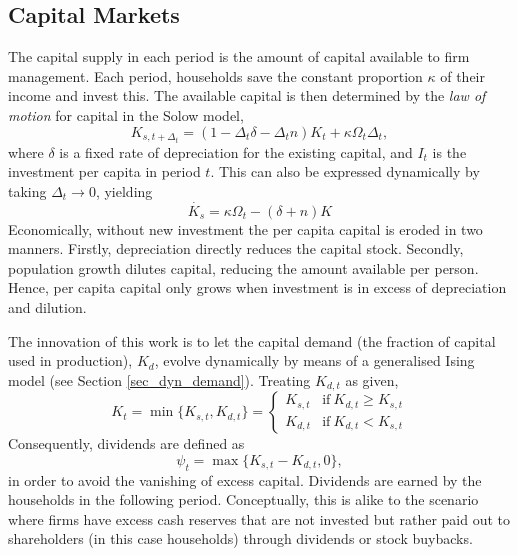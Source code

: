 \documentclass[11pt]{article}
\begin{document}
\subsection{Capital Markets}\label{sec_cap_mkt}
The capital supply in each period is the amount of capital available to firm management. Each period, households save the constant proportion $\kappa$ of their income and invest this.
The available capital is then determined by the \textit{law of motion} for capital in the Solow model, 
\begin{equation}\label{eq_cap_motion}
K_{s,t+\Delta_t} = (1-\Delta_t\delta-\Delta_tn)K_t + \kappa\Omega_t\Delta_t,
\end{equation}
where $\delta$ is a fixed rate of depreciation for the existing capital, and $I_t$ is the investment per capita in period $t$. This can also be expressed dynamically by taking $\Delta_t\rightarrow0$, yielding
\begin{equation}\label{eq_cap_motion_d}
\dot{K_s} = \kappa\Omega_t - (\delta+n)K
\end{equation}
Economically, without new investment the per capita capital is eroded in two manners. Firstly, depreciation directly reduces the capital stock. Secondly, population growth dilutes capital, reducing the amount available per person. Hence, per capita capital only grows when investment is in excess of depreciation and dilution.

The innovation of this work is to let the capital demand (the fraction of capital used in production), $K_d$, evolve dynamically by means of a generalised Ising model (see Section \ref{sec_dyn_demand}). Treating $K_{d,t}$ as given, 
\begin{equation}\label{eq_mkt_clearing}
K_{t} = \min\{K_{s,t},K_{d,t}\} = 
\begin{cases}
K_{s,t} & \textrm{if}~K_{d,t}\geq K_{s,t} \\
K_{d,t} & \textrm{if}~K_{d,t}<K_{s,t}
\end{cases}
\end{equation}
Consequently, dividends are defined as
\begin{equation}\label{eq_dividend}
\psi_t = \max\{K_{s,t}-K_{d,t},0\},
\end{equation} 
in order to avoid the vanishing of excess capital. Dividends are earned by the households in the following period. Conceptually, this is alike to the scenario where firms have excess cash reserves that are not invested but rather paid out to shareholders (in this case households) through dividends or stock buybacks.
\end{document}
